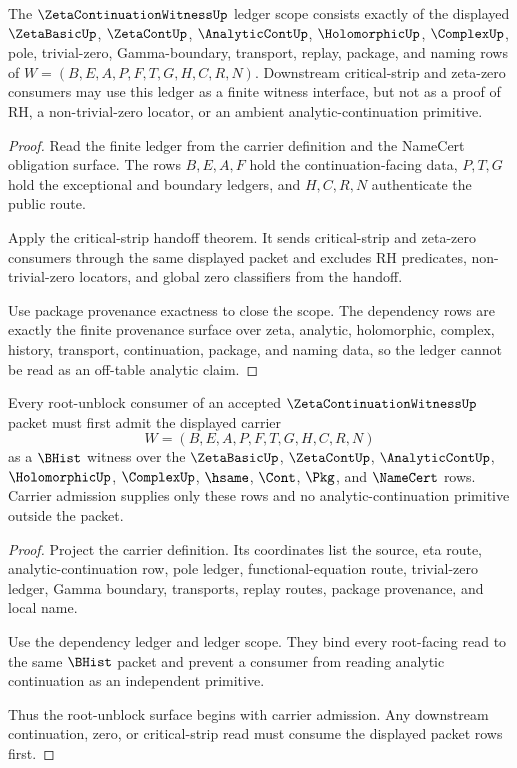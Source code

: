 \begin{theorem}
\label{thm:zeta-continuation-witness-ledger-scope}
The $\ZetaContinuationWitnessUp$ ledger scope consists exactly of the displayed $\ZetaBasicUp$, $\ZetaContUp$, $\AnalyticContUp$, $\HolomorphicUp$, $\ComplexUp$, pole, trivial-zero, Gamma-boundary, transport, replay, package, and naming rows of $W=(B,E,A,P,F,T,G,H,C,R,N)$. Downstream critical-strip and zeta-zero consumers may use this ledger as a finite witness interface, but not as a proof of RH, a non-trivial-zero locator, or an ambient analytic-continuation primitive.
\end{theorem}
\begin{proof}
Read the finite ledger from the carrier definition and the NameCert obligation surface. The rows $B,E,A,F$ hold the continuation-facing data, $P,T,G$ hold the exceptional and boundary ledgers, and $H,C,R,N$ authenticate the public route.

Apply the critical-strip handoff theorem. It sends critical-strip and zeta-zero consumers through the same displayed packet and excludes RH predicates, non-trivial-zero locators, and global zero classifiers from the handoff.

Use package provenance exactness to close the scope. The dependency rows are exactly the finite provenance surface over zeta, analytic, holomorphic, complex, history, transport, continuation, package, and naming data, so the ledger cannot be read as an off-table analytic claim.
\end{proof}

\begin{theorem}
\label{thm:zeta-continuation-witness-carrier-obligation}
Every root-unblock consumer of an accepted $\ZetaContinuationWitnessUp$ packet must first admit the displayed carrier
$$
W=(B,E,A,P,F,T,G,H,C,R,N)
$$
as a $\BHist$ witness over the $\ZetaBasicUp$, $\ZetaContUp$, $\AnalyticContUp$, $\HolomorphicUp$, $\ComplexUp$, $\hsame$, $\Cont$, $\Pkg$, and $\NameCert$ rows. Carrier admission supplies only these rows and no analytic-continuation primitive outside the packet.
\end{theorem}
\begin{proof}
Project the carrier definition. Its coordinates list the source, eta route, analytic-continuation row, pole ledger, functional-equation route, trivial-zero ledger, Gamma boundary, transports, replay routes, package provenance, and local name.

Use the dependency ledger and ledger scope. They bind every root-facing read to the same $\BHist$ packet and prevent a consumer from reading analytic continuation as an independent primitive.

Thus the root-unblock surface begins with carrier admission. Any downstream continuation, zero, or critical-strip read must consume the displayed packet rows first.
\end{proof}

